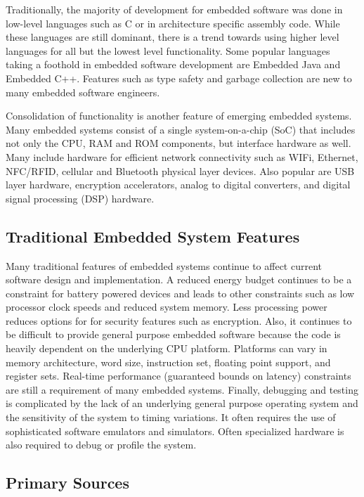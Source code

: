 \documentclass[final,conference,11pt]{IEEEtran}
\begin{document}
Traditionally, the majority of development for embedded software was done in low-level languages such as C or in architecture specific assembly code.  While these languages are still dominant, there is a trend towards using higher level languages for all but the lowest level functionality.  Some popular languages taking a foothold in embedded software development are Embedded Java and Embedded C++. Features such as type safety and garbage collection are new to many embedded software engineers.

Consolidation of functionality is another feature of emerging embedded systems.  Many embedded systems consist of a single system-on-a-chip (SoC) that includes not only the CPU, RAM and ROM components, but interface hardware as well.  Many include hardware for efficient network connectivity such as WIFi, Ethernet, NFC/RFID, cellular and Bluetooth physical layer devices.  Also popular are USB layer hardware, encryption accelerators, analog to digital converters, and digital signal processing (DSP) hardware. 

\subsection{Traditional Embedded System Features}

Many traditional features of embedded systems continue to affect current software design and implementation.  A reduced energy budget continues to be a constraint for battery powered devices and leads to other constraints such as low processor clock speeds and reduced system memory.  Less processing power reduces options for for security features such as encryption.  Also, it continues to be difficult to provide general purpose embedded software because the code is heavily dependent on the underlying CPU platform.  Platforms can vary in memory architecture, word size, instruction set, floating point support, and register sets.  Real-time performance (guaranteed bounds on latency) constraints are still a requirement of many embedded systems. Finally, debugging and testing is complicated by the lack of an underlying general purpose operating system and the sensitivity of the system to timing variations.  It often requires the use of sophisticated software emulators and simulators.  Often specialized hardware is also required to debug or profile the system.

\subsection{Primary Sources}
\end{document}

